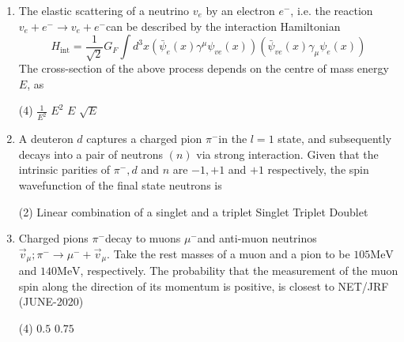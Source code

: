 \begin{enumerate}
	\item  The elastic scattering of a neutrino $v_e$ by an electron $e^{-}$, i.e. the reaction $v_e+e^{-} \rightarrow v_e+e^{-}$can be described by the interaction Hamiltonian
	$$
	H_{\mathrm{int}}=\frac{1}{\sqrt{2}} G_F \int d^3 x\left(\bar{\psi}_e(x) \gamma^\mu \psi_{v e}(x)\right)\left(\bar{\psi}_{v e}(x) \gamma_\mu \psi_e(x)\right)
	$$
	The cross-section of the above process depends on the centre of mass energy $E$, as
	{}
	 \begin{tasks}(4)
		\task[\textbf{a.}]$\frac{1}{E^2}$
		\task[\textbf{b.}]$E^2$
		\task[\textbf{c.}]$E$
		\task[\textbf{d.}] $\sqrt{E}$
	\end{tasks}

	\item  A deuteron $d$ captures a charged pion $\pi^{-}$in the $l=1$ state, and subsequently decays into a pair of neutrons $(n)$ via strong interaction. Given that the intrinsic parities of $\pi^{-}, d$ and $n$ are $-1,+1$ and $+1$ respectively, the spin wavefunction of the final state neutrons is
	{}
	 \begin{tasks}(2)
		\task[\textbf{a.}]Linear combination of a singlet and a triplet
		\task[\textbf{b.}]Singlet
		\task[\textbf{c.}]Triplet
		\task[\textbf{d.}] Doublet
	\end{tasks}

	\item  Charged pions $\pi^{-}$decay to muons $\mu^{-}$and anti-muon neutrinos $\vec{v}_\mu ; \pi^{-} \rightarrow \mu^{-}+\vec{v}_\mu$. Take the rest masses of a muon and a pion to be $105 \mathrm{MeV}$ and $140 \mathrm{MeV}$, respectively. The probability that the measurement of the muon spin along the direction of its momentum is positive, is closest to
	NET/JRF (JUNE-2020)
	 \begin{tasks}(4)
		\task[\textbf{a.}]$0.5$
		\task[\textbf{b.}]$0.75$
	\end{tasks}
	

\end{enumerate}
